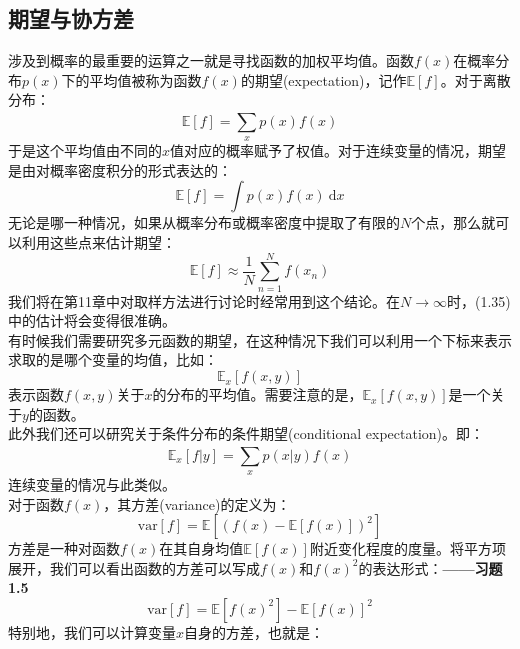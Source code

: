\documentclass[b5paper]{book}
\numberwithin{equation}{chapter}
\begin{document}
	\subsection{期望与协方差}
	\textnormal{涉及到概率的最重要的运算之一就是寻找函数的加权平均值。函数$f(x)$在概率分布$p(x)$下的平均值被称为函数$f(x)$的期望(expectation)，记作$\mathbb{E}[f]$。对于离散分布：
	\begin{equation}
		\mathbb{E}[f]=\sum_{x}^{} p(x)f(x)
	\end{equation}
	\indent 于是这个平均值由不同的$x$值对应的概率赋予了权值。对于连续变量的情况，期望是由对概率密度积分的形式表达的：
	\begin{equation}
		\mathbb{E}[f]=\int p(x)f(x)\ \mathrm{d}x
	\end{equation}
	\indent 无论是哪一种情况，如果从概率分布或概率密度中提取了有限的$N$个点，那么就可以利用这些点来估计期望：
	\begin{equation}
		\mathbb{E}[f] \approx \frac{1}{N}\sum_{n=1}^{N}f(x_n)
	\end{equation}
	\indent 我们将在第11章中对取样方法进行讨论时经常用到这个结论。在$N \rightarrow \infty$时，(1.35)中的估计将会变得很准确。\\
	\indent 有时候我们需要研究多元函数的期望，在这种情况下我们可以利用一个下标来表示求取的是哪个变量的均值，比如：
	\begin{equation}
		\mathbb{E}_x[f(x,y)]
	\end{equation}
	表示函数$f(x,y)$关于$x$的分布的平均值。需要注意的是，$\mathbb{E}_x[f(x,y)]$是一个关于$y$的函数。\\
	\indent 此外我们还可以研究关于条件分布的条件期望(conditional expectation)。即：
	\begin{equation}
		\mathbb{E}_x[f|y]=\sum_{x}^{}p(x|y)f(x)
	\end{equation}
	\indent 连续变量的情况与此类似。\\
	\indent 对于函数$f(x)$，其方差(variance)的定义为：
	\begin{equation}
		\mathrm{var} [f]=\mathbb{E}[(f(x)-\mathbb{E}[f(x)])^2]
	\end{equation}
	\indent 方差是一种对函数$f(x)$在其自身均值$\mathbb{E}[f(x)]$附近变化程度的度量。将平方项展开，我们可以看出函数的方差可以写成$f(x)$和$f(x)^2$的表达形式：\color{red}\textbf{——习题1.5}\color{black}
	\begin{equation}
		\mathrm{var}[f]=\mathbb{E}[f(x)^2]-\mathbb{E}[f(x)]^2
	\end{equation}
	\indent 特别地，我们可以计算变量$x$自身的方差，也就是：
	\begin{equation}

\end{equation}}
\end{document}
